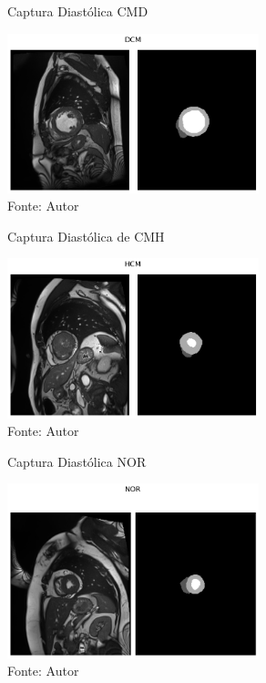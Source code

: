\begin{figure}[h!]
    \centering
    \caption{Captura Diastólica CMD}
    \includegraphics[width=0.65\textwidth]{figures/fig018.png}
    \caption*{Fonte: Autor}
    \label{fig:fig018}
\end{figure}

\begin{figure}[h!]
    \caption{Captura Diastólica de CMH}
    \centering
    \includegraphics[width=0.65\textwidth]{figures/fig019.png}
    \caption*{Fonte: Autor}
    \label{fig:fig019}
\end{figure}

\begin{figure}[h!]
    \centering
    \caption{Captura Diastólica NOR}
    \includegraphics[width=0.65\textwidth]{figures/fig020.png}
    \caption*{Fonte: Autor}
    \label{fig:fig020}
\end{figure}

